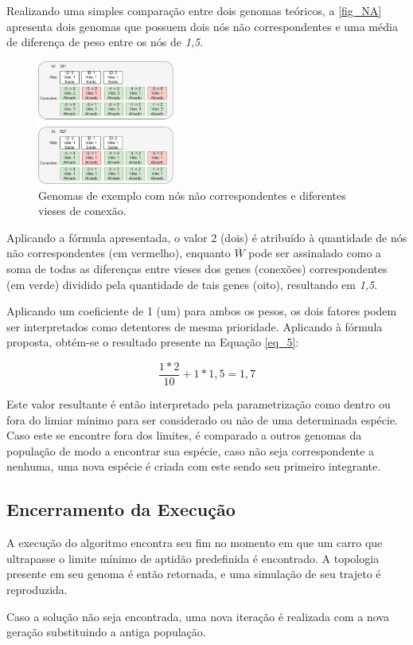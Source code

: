 Realizando uma simples comparação entre dois genomas teóricos, a \autoref{fig_NA} apresenta
dois genomas que possuem dois nós não correspondentes e uma média de diferença de peso entre os nós de \textit{1,5}.

\begin{figure}[htb]
        \centering
        \caption{\label{fig_NA}Genomas de exemplo com nós não correspondentes e diferentes vieses de conexão.}
        \includegraphics[width=0.4\textwidth]{images/NA.png}
\end{figure}

Aplicando a fórmula apresentada, o valor 2 (dois) é atribuído à quantidade
de nós não correspondentes (em vermelho), enquanto $\overline{W}$ pode ser
assinalado como a soma de todas as diferenças entre vieses dos genes (conexões)
correspondentes (em verde) dividido pela quantidade de tais genes (oito), resultando em \textit{1,5}.

Aplicando um coeficiente de 1 (um) para ambos os pesos, os dois fatores podem ser
interpretados como detentores de mesma prioridade. Aplicando à fórmula proposta, obtém-se o resultado presente na Equação \ref{eq_5}:

\begin{equation}
\label{eq_5}
\frac{1 * 2}{10} + 1 * 1,5 = 1,7
\end{equation}


Este valor resultante é então interpretado pela parametrização como dentro ou fora do
limiar mínimo para ser considerado ou não de uma determinada espécie. Caso este se
encontre fora dos limites, é comparado a outros genomas da população de modo a encontrar
sua espécie, caso não seja correspondente a nenhuma, uma nova espécie é criada com este sendo seu primeiro integrante.

\subsection{Encerramento da Execução}
A execução do algoritmo encontra seu fim no momento em que um carro
que ultrapasse o limite mínimo de aptidão predefinida é encontrado.
A topologia presente em seu genoma é então retornada, e uma simulação de seu trajeto é reproduzida.

Caso a solução não seja encontrada, uma nova iteração é realizada com a nova geração substituindo a antiga população.
